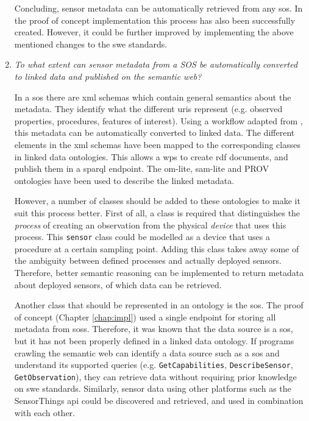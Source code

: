 \begin{enumerate}
Concluding, sensor metadata can be automatically retrieved from any \ac{sos}. In the proof of concept implementation this process has also been successfully created. However, it could be further improved by implementing the above mentioned changes to the \ac{swe} standards.

\item \textit{To what extent can sensor metadata from a SOS be automatically converted to linked data and published on the semantic web?}%

In a \ac{sos} there are \ac{xml} schemas which contain general semantics about the metadata. They identify what the different \acp{uri} represent (e.g. observed properties, procedures, features of interest). Using a workflow adapted from \cite{LD:Missier}, this metadata can be automatically converted to linked data. The different elements in the \ac{xml} schemas have been mapped to the corresponding classes in linked data ontologies. This allows a \ac{wps} to create \ac{rdf} documents, and publish them in a \acs{sparql} endpoint. The om-lite, sam-lite and PROV ontologies have been used to describe the linked metadata.

However, a number of classes should be added to these ontologies to make it suit this process better. First of all, a class is required that distinguishes the \textit{process} of creating an observation from the physical \textit{device} that uses this process. This \texttt{sensor} class could be modelled as a device that uses a procedure at a certain sampling point. Adding this class takes away some of the ambiguity between defined processes and actually deployed sensors. Therefore, better semantic reasoning can be implemented to return metadata about deployed sensors, of which data can be retrieved.  

Another class that should be represented in an ontology is the \acl{sos}. The proof of concept (Chapter \ref{chap:impl}) used a single endpoint for storing all metadata from \aclp{sos}. Therefore, it was known that the data source is a \ac{sos}, but it has not been properly defined in a linked data ontology. If programs crawling the semantic web can identify a data source such as a \ac{sos} and understand its supported queries (e.g. \texttt{GetCapabilities}, \texttt{DescribeSensor}, \texttt{GetObservation}), they can retrieve data without requiring prior knowledge on \ac{swe} standards. Similarly, sensor data using other platforms such as the SensorThings \acs{api} could be discovered and retrieved, and used in combination with each other.           


\end{enumerate}
